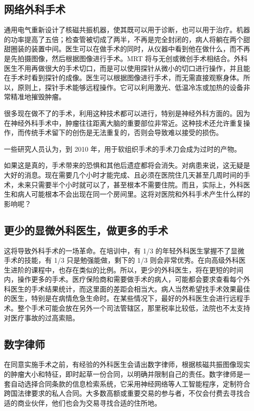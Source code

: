 \subsection{网络外科手术}
通用电气重新设计了核磁共振机器，使其既可以用于诊断，也可以用于治疗。机器的功率提高了五倍；检查管被切成了两半，不再是完全封闭的，病人将躺在两个甜甜圈装的装置中间。医生可以在做手术的同时，从仪器中看到他在做什么，而不再是先拍摄图像，然后根据图像进行手术。MRT 将与无创或微创手术相结合。外科医生不用再做很大的手术切口，而是可以使用探针从微小的切口进行操作，并且能在手术时看到探针的成像。医生可以根据图像进行手术，而无需直接观察身体。所以，原则上，探针手术能够远程操作。它可以利用激光、低温冷冻或加热的设备非常精准地摧毁肿瘤。

很多现在做不了的手术，利用这种技术都可以进行，特别是神经外科方面的。因为在神经外科手术中，肿瘤往往距离大脑的重要部位非常近。这种技术还允许重复操作，而传统手术留下的创伤是无法重复的，否则会导致难以接受的损伤。

一些研究人员认为，到 2010 年，用于软组织手术的手术刀会成为过时的产物。

如果这是真的，手术带来的恐惧和其他后遗症都将会消失。对病患来说，这无疑是大好的消息。现在需要几个小时才能完成、且必须在医院住几天甚至几周时间的手术，未来只需要半个小时就可以了，甚至根本不需要住院。而且，实际上，外科医生和病人可能根本不会出现在同一个房间里。这将对医院和外科手术产生什么样的影响呢？

\subsection{更少的显微外科医生，做更多的手术}
这将导致外科手术的一场革命。在培训中，有 1/3 的年轻外科医生掌握不了显微手术的技能，有 1/3 只是勉强能做，剩下的 1/3 则会非常优秀。在向高级外科医生进阶的课程中，也存在类似的比例。所以，更少的外科医生，将在更短的时间内，操作更多的手术。医疗保险商和需要做手术的病人，可能都会要求查看每个外科医生的手术结果统计，而这里面的差距会相当大。病人当然希望找手术效果最佳的医生，特别是在病情危急生命时。在某些情况下，最好的外科医生会进行远程手术。整个手术可能会放在另外一个司法管辖区，那里税率比较低，法院也不太支持对医疗事故的过高索赔。

\subsection{数字律师}
在同意实施手术之前，有经验的外科医生会请出数字律师，根据核磁共振图像现实的肿瘤大小和特征，即时起草一份合同，以明确并限制自己的责任。数字律师是一套自动选择合同条款的信息检索系统，它采用神经网络等人工智能程序，定制符合跨国法律要求的私人合同。大多数高额或重要交易的参与者，不仅会付费去寻找合适的商业伙伴，他们也会为交易寻找合适的住所地。

